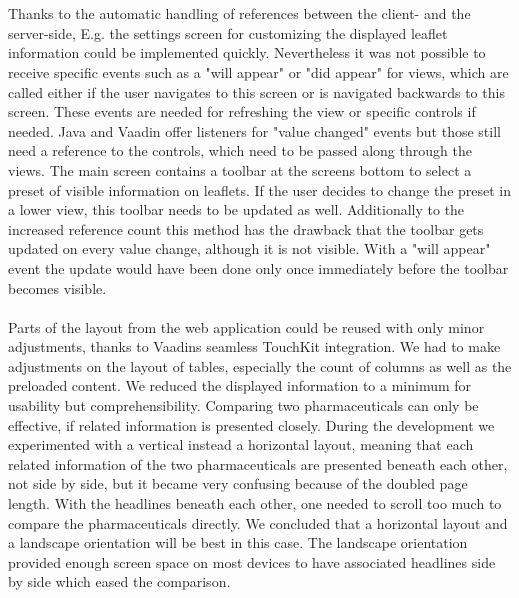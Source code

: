 \\
\\
Thanks to the automatic handling of references between the client- and the server-side, E.g. the settings screen for customizing the displayed leaflet information could be implemented quickly. Nevertheless it was not possible to receive specific events such as a "will appear" or "did appear" for views, which are called either if the user navigates to this screen or is navigated backwards to this screen. These events are needed for refreshing the view or specific controls if needed. Java and Vaadin offer listeners for "value changed" events but those still need a reference to the controls, which need to be passed along through the views. The main screen contains a toolbar at the screens bottom to select a preset of visible information on leaflets. If the user decides to change the preset in a lower view, this toolbar needs to be updated as well. Additionally to the increased reference count this method has the drawback that the toolbar gets updated on every value change, although it is not visible. With a "will appear" event the update would have been done only once immediately before the toolbar becomes visible.
\\
\\
Parts of the layout from the web application could be reused with only minor adjustments, thanks to Vaadins seamless TouchKit integration. We had to make adjustments on the layout of tables, especially the count of columns as well as the preloaded content. We reduced the displayed information to a minimum for usability but comprehensibility. Comparing two pharmaceuticals can only be effective, if related information is presented closely. During the development we experimented with a vertical instead a horizontal layout, meaning that each related information of the two pharmaceuticals are presented beneath each other, not side by side, but it became very confusing because of the doubled page length. With the headlines beneath each other, one needed to scroll too much to compare the pharmaceuticals directly. We concluded that a horizontal layout and a landscape orientation will be best in this case. The landscape orientation provided enough screen space on most devices to have associated headlines side by side which eased the comparison.


